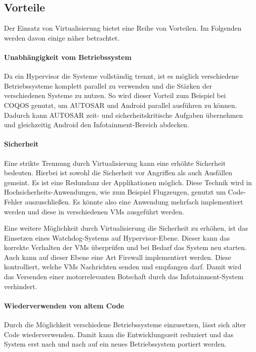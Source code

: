 \documentclass[
  a4paper,					    %
  twoside,
  DIV=calc,     				%
  bibliography=totoc,
  cleardoublepage=empty,
  ngerman,     					%
  final       					%
]{scrbook}
\begin{document}
\subsection{Vorteile}
Der Einsatz von Virtualisierung bietet eine Reihe von Vorteilen\cite{wiki:emb_hyp}. Im Folgenden werden davon einige näher betrachtet.

\paragraph{Unabhängigkeit vom Betriebssystem}
Da ein Hypervisor die Systeme vollständig trennt, ist es möglich verschiedene Betriebssysteme komplett parallel zu verwenden und die Stärken der verschiedenen Systeme zu nutzen. So wird dieser Vorteil zum Beispiel bei COQOS genutzt, um AUTOSAR und Android parallel ausführen zu können. Dadurch kann AUTOSAR zeit- und sicherheitskritische Aufgaben übernehmen und gleichzeitig Android den Infotainment-Bereich abdecken.

\paragraph{Sicherheit}
Eine strikte Trennung durch Virtualisierung kann eine erhöhte Sicherheit bedeuten. Hierbei ist sowohl die Sicherheit vor Angriffen als auch Ausfällen gemeint. Es ist eine Redundanz der Applikationen möglich. Diese Technik wird in Hochsicherheits-Anwendungen, wie zum Beispiel Flugzeugen, genutzt um Code-Fehler auszuschließen. Es könnte also eine Anwendung mehrfach implementiert werden und diese in verschiedenen VMs ausgeführt werden.

Eine weitere Möglichkeit durch Virtualisierung die Sicherheit zu erhöhen, ist das Einsetzen eines Watchdog-Systems auf Hypervisor-Ebene. Dieser kann das korrekte Verhalten der VMs überprüfen und bei Bedarf das System neu starten. Auch kann auf dieser Ebene eine Art Firewall implementiert werden. Diese kontrolliert, welche VMs Nachrichten senden und empfangen darf. Damit wird das Versenden einer motorrelevanten Botschaft durch das Infotainment-System verhindert.

\paragraph{Wiederverwenden von altem Code}
Durch die Möglichkeit verschiedene Betriebssysteme einzusetzen, lässt sich alter Code wiederverwenden. Damit kann die Entwicklungszeit reduziert und das System erst nach und nach auf ein neues Betriebssystem portiert werden.
\end{document}
